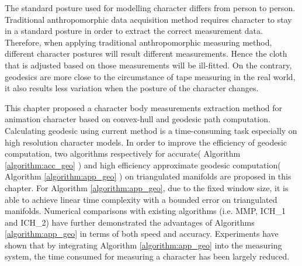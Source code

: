 The standard posture used for modelling character differs from person to person. Traditional anthropomorphic data acquisition method requires character to stay in a standard posture in order to extract the correct measurement data. Therefore, when applying traditional anthropomorphic measuring method, different character postures will result different measurements. Hence the cloth that is adjusted based on those measurements will be ill-fitted. On the contrary, geodesics are more close to the circumstance of tape measuring in the real world, it also results less variation when the posture of the character changes. 

This chapter proposed a character body measurements extraction method for animation character based on convex-hull and geodesic path computation. Calculating geodesic using current method is a time-consuming task especially on high resolution character models. In order to improve the efficiency of geodesic computation, two algorithms respectively for accurate( Algorithm \ref{algorithm:acc_geo} ) and high efficiency approximate geodesic computation( Algorithm \ref{algorithm:app_geo} ) on triangulated manifolds are proposed in this chapter. For Algorithm \ref{algorithm:app_geo}, due to the fixed window size, it is able to achieve linear time complexity with a bounded error on triangulated manifolds. Numerical comparisons with existing algorithms (i.e. MMP, ICH\_1 and ICH\_2) have further demonstrated the advantages of Algorithms \ref{algorithm:app_geo} in terms of both speed and accuracy. Experiments have shown that by integrating Algorithm \ref{algorithm:app_geo} into the measuring system, the time consumed for measuring a character has been largely reduced.




\ifx\isEmbedded\undefined


\pagebreak

\fi
